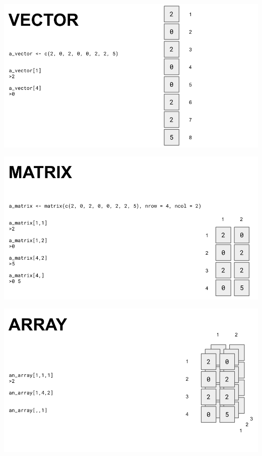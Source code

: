 \documentclass[
  ignorenonframetext,
]{beamer}
\begin{document}
\begin{frame}

\includegraphics{../external/images/VECTOR.png}

\end{frame}

\begin{frame}

\includegraphics{../external/images/MATRIX.png}

\end{frame}

\begin{frame}

\includegraphics{../external/images/ARRAY_3.png}

\end{frame}
\end{document}
